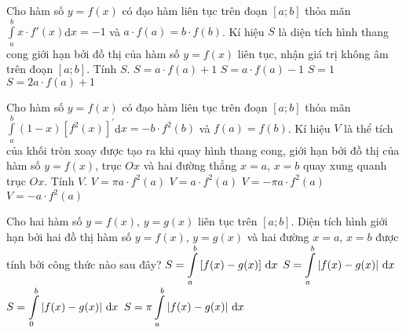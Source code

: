 \begin{ex}%
	Cho hàm số $y=f(x)$ có đạo hàm liên tục trên đoạn $[a; b]$ thỏa mãn $\displaystyle \int \limits_{a}^{b} x\cdot f'(x)$d$x=-1$ và $a\cdot f(a)=b\cdot f(b)$. Kí hiệu $S$ là diện tích hình thang cong giới hạn bởi đồ thị của hàm số $y=f(x)$ liên tục, nhận giá trị không âm trên đoạn $[a; b]$. Tính $S$.
	\choice
	{$S=a\cdot f(a)+1$}
	{$S=a\cdot f(a)-1$}
	{\True $S=1$}
	{$S=2a\cdot f(a)+1$}
\end{ex}

\begin{ex}%
	Cho hàm số $y=f(x)$ có đạo hàm liên tục trên đoạn $[a; b]$ thỏa mãn $\displaystyle \int \limits_{a}^{b} (1-x) \left[f^2 (x)\right]^{'}$d$x=-b \cdot f^2(b)$ và $f(a)=f(b)$. Kí hiệu $V$ là thể tích của khối tròn xoay được tạo ra khi quay hình thang cong, giới hạn bởi đồ thị của hàm số $y=f(x)$, trục $Ox$ và hai đường thẳng $x=a$, $x=b$ quay xung quanh trục $Ox$. Tính $V.$
	\choice
	{$V=\pi a\cdot f^2(a)$}
	{$V=a \cdot f^2(a)$}
	{\True $V=-\pi a \cdot f^2(a)$}
	{$V=-a \cdot f^2(a)$}
\end{ex}

\begin{ex}%
	Cho hai hàm số $y=f(x)$, $y=g(x)$ liên tục trên $[a;b].$ Diện tích hình giới hạn bởi hai đồ thị hàm số $y=f(x)$, $y=g(x)$ và hai đường $x=a$, $x=b$ được tính bởi công thức nào sau đây?
	\choice
	{$S=\displaystyle\int\limits_a^b\left[f(x)-g(x)\right]\textrm{\,d}x$}
	{\True $S=\displaystyle\int\limits_a^b\left|f(x)-g(x)\right|\textrm{\,d}x$}
	{$S=\displaystyle\int\limits_0^b\left|f(x)-g(x)\right|\textrm{\,d}x$}
	{$S=\displaystyle\pi\int\limits_a^b\left|f(x)-g(x)\right|\textrm{\,d}x$}
\end{ex}

